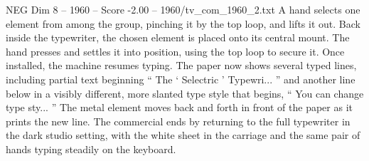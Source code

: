 \begin{textsample}{NEG Dim 8 – 1960 – Score -2.00 – 1960/tv\_com\_1960\_2.txt}
A hand selects one element from among the group, pinching it by the top loop, and lifts it out.
Back inside the typewriter, the chosen element is placed onto its central mount.
The hand presses and settles it into position, using the top loop to secure it.
Once installed, the machine resumes typing.
The paper now shows several typed lines, including partial text beginning “ The ‘ Selectric ’ Typewri... ” and another line below in a visibly different, more slanted type style that begins, “ You can change type sty... ” The metal element moves back and forth in front of the paper as it prints the new line.
The commercial ends by returning to the full typewriter in the dark studio setting, with the white sheet in the carriage and the same pair of hands typing steadily on the keyboard.

\end{textsample}
